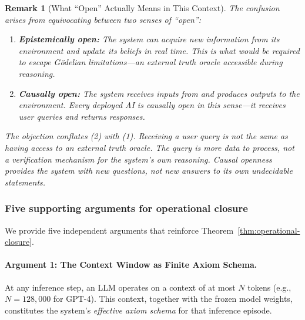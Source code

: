 \documentclass[11pt]{article}
\newtheorem{remark}{Remark}
\begin{document}
\begin{remark}[What ``Open'' Actually Means in This Context]
\label{rem:open-types}
The confusion arises from equivocating between two senses of ``open'':
\begin{enumerate}
\item \textbf{Epistemically open:} The system can acquire new information from
      its environment and update its beliefs in real time. This is what would
      be required to escape G\"{o}delian limitations---an external truth oracle
      accessible during reasoning.
\item \textbf{Causally open:} The system receives inputs from and produces
      outputs to the environment. Every deployed AI is causally open in this
      sense---it receives user queries and returns responses.
\end{enumerate}
The objection conflates (2) with (1). Receiving a user query is not the same
as having access to an external truth oracle. The query is \textit{more data
to process}, not \textit{a verification mechanism for the system's own
reasoning}. Causal openness provides the system with new \textit{questions},
not new \textit{answers to its own undecidable statements}.
\end{remark}

\subsubsection{Five supporting arguments for operational closure}

We provide five independent arguments that reinforce
Theorem~\ref{thm:operational-closure}.

\paragraph{Argument 1: The Context Window as Finite Axiom Schema.}

At any inference step, an LLM operates on a context of at most $N$ tokens
(e.g., $N = 128{,}000$ for GPT-4). This context, together with the frozen
model weights, constitutes the system's \textit{effective axiom schema} for
that inference episode.
\end{document}
